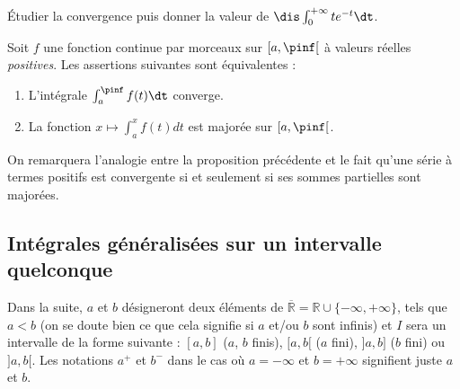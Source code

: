 \documentclass[a4paper,10pt]{report}
\begin{document}
\begin{exa} Étudier la convergence puis donner la valeur de $\dis \int_{0}^{+ \infty} t e^{-t} \dt$.
\end{exa}

\begin{prop} Soit $f$ une fonction continue par morceaux sur $[a,\pinf[$ à valeurs réelles \textit{positives}. Les assertions suivantes sont équivalentes :
\begin{enumerate}
\item L'intégrale $\int_a^\pinf f(t) \dt$ converge.
\item La fonction $x \mapsto \int_{a}^x f(t) dt$ est majorée sur $[a,\pinf[$.
\end{enumerate}
\end{prop}

\medskip

\begin{preuve} 

\vspace{4cm}
%
\end{preuve}

\medskip

\begin{rem} On remarquera l'analogie entre la proposition précédente et le fait qu'une série à termes positifs est convergente si et seulement si ses sommes partielles sont majorées.
\end{rem}

\subsection{Intégrales généralisées sur un intervalle quelconque}
\noindent Dans la suite, $a$ et $b$ désigneront deux éléments de $\overline{\mathbb{R}} = \mathbb{R} \cup \lbrace - \infty, + \infty \rbrace$, tels que $a<b$ (on se doute bien ce que cela signifie si $a$ et/ou $b$ sont infinis) et $I$ sera un intervalle de la forme suivante : $[a,b]$ ($a$, $b$ finis), $[a,b[$ ($a$ fini), $]a,b]$ ($b$ fini) ou $]a,b[$. Les notations $a^+$ et $b^{-}$ dans le cas où $a= - \infty$ et $b = + \infty$ signifient juste $a$ et $b$.
\end{document}
